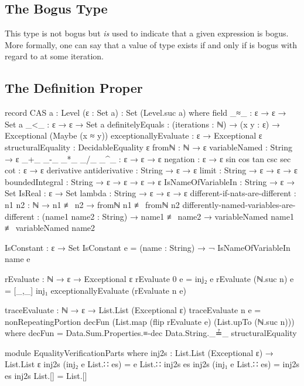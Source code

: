 \documentclass{report}
\begin{document}
\subsection{The Bogus Type}
This type is not bogus but \emph{is} used to indicate that a given expression is bogus.  More formally, one can say that a value of type    exists if and only if  is bogus with regard to   at some iteration.

\subsection{The Definition Proper}

\begin{code}
record CAS {a : Level} (ε : Set a) : Set (Level.suc a) where
  field
    _≈_ : ε → ε → Set a
    _<_ : ε → ε → Set a
    definitelyEquals : (iterations : ℕ) →
                       (x y : ε) →
                       Exceptional (Maybe (x ≈ y))
    exceptionallyEvaluate : ε → Exceptional ε
    structuralEquality : DecidableEquality ε
    fromℕ : ℕ → ε
    variableNamed : String → ε
    _+_
     _-_
     _*_
     _/_
     _^_ : ε → ε → ε
    negation : ε → ε
    sin
     cos
     tan
     csc
     sec
     cot : ε → ε
    derivative
     antiderivative : String → ε → ε
    limit : String → ε → ε → ε
    boundedIntegral : String → ε → ε → ε → ε
    IsNameOfVariableIn : String → ε → Set
    IsReal : ε → Set
    lambda : String → ε → ε → ε
    different-if-nats-are-different :
      {n1 n2 : ℕ} → n1 ≢ n2 → fromℕ n1 ≢ fromℕ n2
    differently-named-variables-are-different :
      (name1 name2 : String) →
      name1 ≢ name2 →
      variableNamed name1 ≢ variableNamed name2

  IsConstant : ε → Set
  IsConstant e = (name : String) → ¬ IsNameOfVariableIn name e

  rEvaluate : ℕ → ε → Exceptional ε
  rEvaluate 0 e = inj₂ e
  rEvaluate (ℕ.suc n) e = [_,_] inj₁ exceptionallyEvaluate (rEvaluate n e)

  traceEvaluate : ℕ → ε → List.List (Exceptional ε)
  traceEvaluate n e =
    nonRepeatingPortion decFun (List.map (flip rEvaluate e) (List.upTo (ℕ.suc n)))
      where decFun = Data.Sum.Properties.≡-dec Data.String._≟_ structuralEquality

  module EqualityVerificationParts where
    inj2s : List.List (Exceptional ε) → List.List ε
    inj2s (inj₂ e List.∷ es) = e List.∷ inj2s es
    inj2s (inj₁ e List.∷ es) = inj2s es
    inj2s List.[] = List.[]


\end{code}
\end{document}
